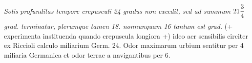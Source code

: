 \pstart {}\textit{ Solis}\protect{}\textit{ profunditas tempore crepusculi 24 gradus non excedit, sed ad summum }$\displaystyle21\frac{3}{4}\rule[-4mm]{0mm}{10mm}$ \textit{grad.}\textit{ terminatur, plerumque tamen 18. nonnunquam 16 tantum est grad.} (+ experimenta instituenda quando crepuscula longiora +) ideo aer sensibilis circiter ex Riccioli\protect{} calculo miliarium Germ. 24.\pend 
\pstart {} Odor maximarum urbium sentitur per 4 miliaria Germanica et odor terrae\protect{} a navigantibus per 6.\pend
